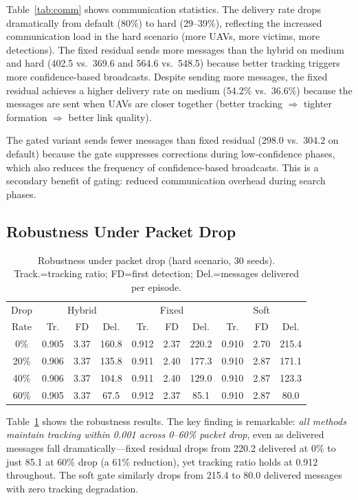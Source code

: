 \documentclass[journal]{IEEEtran}
\begin{document}
Table~\ref{tab:comm} shows communication statistics. The delivery rate drops
dramatically from default (80\%) to hard (29--39\%), reflecting the increased
communication load in the hard scenario (more UAVs, more victims, more detections).
The fixed residual sends more messages than the hybrid on medium and hard (402.5 vs.\
369.6 and 564.6 vs.\ 548.5) because better tracking triggers more confidence-based
broadcasts. Despite sending more messages, the fixed residual achieves a higher
delivery rate on medium (54.2\% vs.\ 36.6\%) because the messages are sent when
UAVs are closer together (better tracking $\Rightarrow$ tighter formation $\Rightarrow$
better link quality).

The gated variant sends fewer messages than fixed residual (298.0 vs.\ 304.2 on
default) because the gate suppresses corrections during low-confidence phases, which
also reduces the frequency of confidence-based broadcasts. This is a secondary benefit
of gating: reduced communication overhead during search phases.

\subsection{Robustness Under Packet Drop}
\label{sec:packet_drop}

\begin{table}[t]
\centering
\caption{Robustness under packet drop (hard scenario, 30 seeds). Track.=tracking
ratio; FD=first detection; Del.=messages delivered per episode.}
\label{tab:packet_drop}
\scriptsize
\setlength{\tabcolsep}{3pt}
\begin{tabular}{@{}cccccccccc@{}}
\toprule
Drop & \multicolumn{3}{c}{Hybrid} & \multicolumn{3}{c}{Fixed} & \multicolumn{3}{c}{Soft} \\
Rate & Tr. & FD & Del. & Tr. & FD & Del. & Tr. & FD & Del. \\
\midrule
0\%  & 0.905 & 3.37 & 160.8 & 0.912 & 2.37 & 220.2 & 0.910 & 2.70 & 215.4 \\
20\% & 0.906 & 3.37 & 135.8 & 0.911 & 2.40 & 177.3 & 0.910 & 2.87 & 171.1 \\
40\% & 0.906 & 3.37 & 104.8 & 0.911 & 2.40 & 129.0 & 0.910 & 2.87 & 123.3 \\
60\% & 0.905 & 3.37 &  67.5 & 0.912 & 2.37 &  85.1 & 0.910 & 2.87 &  80.0 \\
\bottomrule
\end{tabular}
\end{table}

Table~\ref{tab:packet_drop} shows the robustness results. The key finding is
remarkable: \emph{all methods maintain tracking within 0.001 across 0--60\% packet
drop}, even as delivered messages fall dramatically---fixed residual drops from 220.2
delivered at 0\% to just 85.1 at 60\% drop (a 61\% reduction), yet tracking ratio
holds at 0.912 throughout. The soft gate similarly drops from 215.4 to 80.0 delivered
messages with zero tracking degradation.
\end{document}
